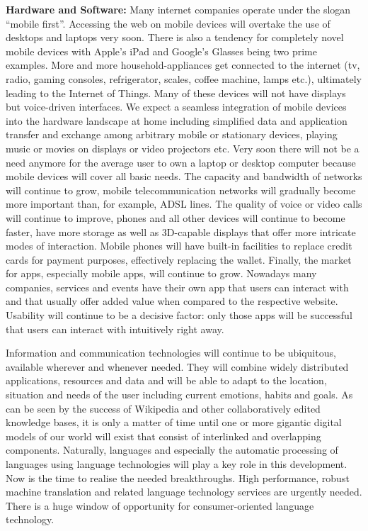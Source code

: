 \documentclass[10pt, plain]{../../metanetpaper}
\begin{document}
\begin{multicols}{2}
\textbf{Hardware and Software:} Many internet companies operate under the slogan ``mobile first''. Accessing the web on mobile devices will overtake the use of desktops and laptops very soon. There is also a tendency for completely novel mobile devices with Apple's iPad and Google's Glasses being two prime examples. More and more household-appliances get connected to the internet (tv, radio, gaming consoles, refrigerator, scales, coffee machine, lamps etc.), ultimately leading to the Internet of Things. Many of these devices will not have displays but voice-driven interfaces. We expect a seamless integration of mobile devices into the hardware landscape at home including simplified data and application transfer and exchange among arbitrary mobile or stationary devices, playing music or movies on displays or video projectors etc. Very soon there will not be a need anymore for the average user to own a laptop or desktop computer because mobile devices will cover all basic needs. The capacity and bandwidth of networks will continue to grow, mobile telecommunication networks will gradually become more important than, for example, ADSL lines. The quality of voice or video calls will continue to improve, phones and all other devices will continue to become faster, have more storage as well as 3D-capable displays that offer more intricate modes of interaction. Mobile phones will have built-in facilities to replace credit cards for payment purposes, effectively replacing the wallet. Finally, the market for apps, especially mobile apps, will continue to grow. Nowadays many companies, services and events have their own app that users can interact with and that usually offer added value when compared to the respective website. Usability will continue to be a decisive factor: only those apps will be successful that users can interact with intuitively right away.

Information and communication technologies will continue to be ubiquitous, available wherever and whenever needed. They will combine widely distributed applications, resources and data and will be able to adapt to the location, situation and needs of the user including current emotions, habits and goals. As can be seen by the success of Wikipedia and other collaboratively edited knowledge bases, it is only a matter of time until one or more gigantic digital models of our world will exist that consist of interlinked and overlapping components. Naturally, languages and especially the automatic processing of languages using language technologies will play a key role in this development. Now is the time to realise the needed breakthroughs. High performance, robust machine translation and related language technology services are urgently needed. There is a huge window of opportunity for consumer-oriented language technology.


\end{multicols}
\end{document}
